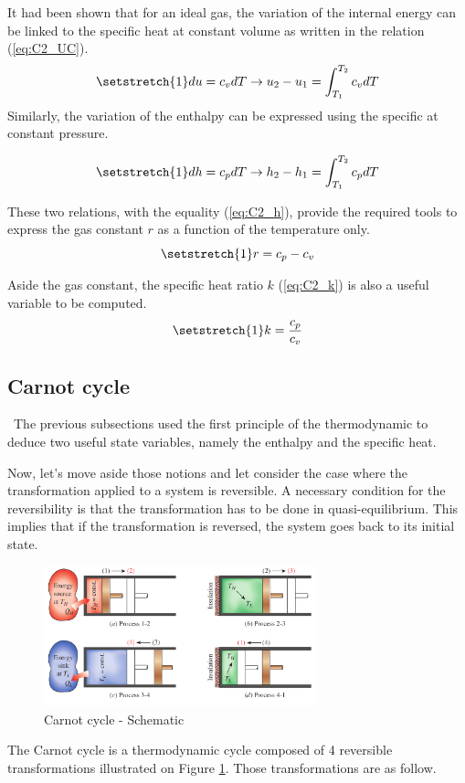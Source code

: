 It had been shown that for an ideal gas, the variation of the internal energy can be linked to the specific heat at constant volume as written in the relation (\ref{eq:C2_UC}).
\begin{equation}
\setstretch{1}
du = c_vdT \rightarrow u_2 - u_1 = \int_{T_1}^{T_2} c_vdT\label{eq:C2_UC}
\end{equation} 
Similarly, the variation of the enthalpy can be expressed using the specific at constant pressure.

\begin{equation}
\setstretch{1}
dh = c_pdT \rightarrow h_2 - h_1 = \int_{T_1}^{T_2} c_pdT\label{eq:C2_UP}
\end{equation} 

These two relations, with the equality (\ref{eq:C2_h}), provide the required tools to express the gas constant $r$ as a function of the temperature only. 
\begin{equation}
\setstretch{1}
r = c_p - c_v \label{eq:C2_r}
\end{equation}

Aside the gas constant, the specific heat ratio $k$ (\ref{eq:C2_k}) is also a useful variable to be computed.
\begin{equation}
\setstretch{1}
k = \frac{c_p}{c_v} \label{eq:C2_k}
\end{equation}

\subsection{Carnot cycle}
\quad\, The previous subsections used the first principle of the thermodynamic to deduce two useful state variables, namely the enthalpy and the specific heat.

Now, let's move aside those notions and let consider the case where the transformation applied to a system is reversible. A necessary condition for the reversibility is that the transformation has to be done in quasi-equilibrium. This implies that if the transformation is reversed, the system goes back to its initial state.


\begin{figure}[h]
\centering
\includegraphics[width=0.7\textwidth]{Carnot_schema.png}
\caption{Carnot cycle - Schematic \cite{2015}}
\label{fig:C2_Carnot}
\end{figure}
The Carnot cycle is a thermodynamic cycle composed of 4 reversible transformations illustrated on Figure \ref{fig:C2_Carnot}. Those transformations are as follow.

